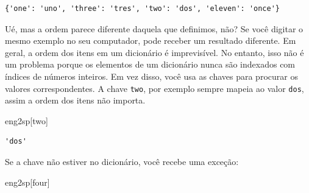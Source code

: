 \documentclass[
  brazilian,
  letterpaper,
  DIV=11,
  numbers=noendperiod]{scrreprt}
\newenvironment{Shaded}{\begin{snugshade}}{\end{snugshade}}
\newcommand{\NormalTok}[1]{\textcolor[rgb]{0.00,0.23,0.31}{#1}}
\newcommand{\StringTok}[1]{\textcolor[rgb]{0.13,0.47,0.30}{#1}}
\begin{document}
\begin{verbatim}
{'one': 'uno', 'three': 'tres', 'two': 'dos', 'eleven': 'once'}
\end{verbatim}

Ué, mas a ordem parece diferente daquela que definimos, não? Se você
digitar o mesmo exemplo no seu computador, pode receber um resultado
diferente. Em geral, a ordem dos itens em um dicionário é imprevisível.
No entanto, isso não é um problema porque os elementos de um dicionário
nunca são indexados com índices de números inteiros. Em vez disso, você
usa as chaves para procurar os valores correspondentes. A chave
\texttt{\textquotesingle{}two\textquotesingle{}}, por exemplo sempre
mapeia ao valor \texttt{\textquotesingle{}dos\textquotesingle{}}, assim
a ordem dos itens não importa.

\begin{Shaded}
\begin{Highlighting}[]
\NormalTok{eng2sp[}\StringTok{\textquotesingle{}two\textquotesingle{}}\NormalTok{]}
\end{Highlighting}
\end{Shaded}

\begin{verbatim}
'dos'
\end{verbatim}

Se a chave não estiver no dicionário, você recebe uma exceção:

\begin{Shaded}
\begin{Highlighting}[]
\NormalTok{eng2sp[}\StringTok{\textquotesingle{}four\textquotesingle{}}\NormalTok{]}
\end{Highlighting}
\end{Shaded}
\end{document}

